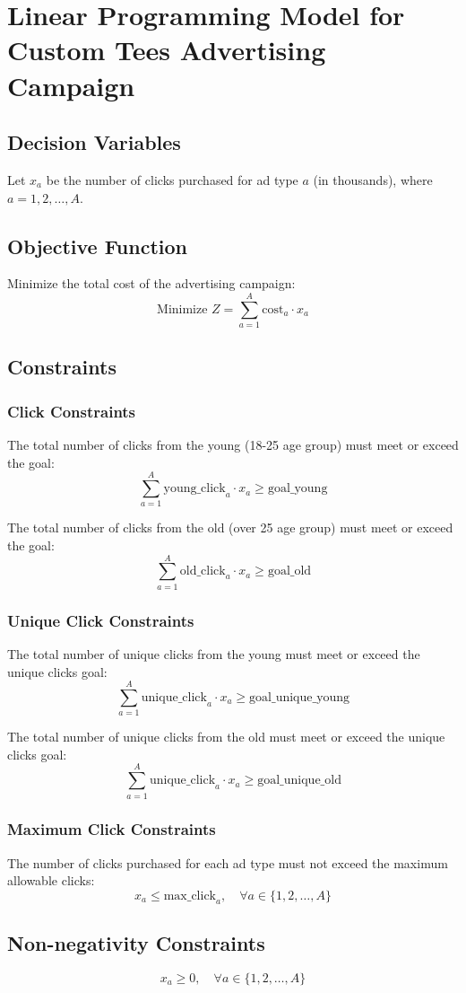 \documentclass{article}
\begin{document}
\section*{Linear Programming Model for Custom Tees Advertising Campaign}

\subsection*{Decision Variables}
Let \( x_a \) be the number of clicks purchased for ad type \( a \) (in thousands), where \( a = 1, 2, \ldots, A \).

\subsection*{Objective Function}
Minimize the total cost of the advertising campaign:
\[
\text{Minimize } Z = \sum_{a=1}^{A} \text{cost}_a \cdot x_a
\]

\subsection*{Constraints}

\subsubsection*{Click Constraints}
The total number of clicks from the young (18-25 age group) must meet or exceed the goal:
\[
\sum_{a=1}^{A} \text{young\_click}_{a} \cdot x_a \geq \text{goal\_young}
\]

The total number of clicks from the old (over 25 age group) must meet or exceed the goal:
\[
\sum_{a=1}^{A} \text{old\_click}_{a} \cdot x_a \geq \text{goal\_old}
\]

\subsubsection*{Unique Click Constraints}
The total number of unique clicks from the young must meet or exceed the unique clicks goal:
\[
\sum_{a=1}^{A} \text{unique\_click}_{a} \cdot x_a \geq \text{goal\_unique\_young}
\]

The total number of unique clicks from the old must meet or exceed the unique clicks goal:
\[
\sum_{a=1}^{A} \text{unique\_click}_{a} \cdot x_a \geq \text{goal\_unique\_old}
\]

\subsubsection*{Maximum Click Constraints}
The number of clicks purchased for each ad type must not exceed the maximum allowable clicks:
\[
x_a \leq \text{max\_click}_{a}, \quad \forall a \in \{1, 2, \ldots, A\}
\]

\subsection*{Non-negativity Constraints}
\[
x_a \geq 0, \quad \forall a \in \{1, 2, \ldots, A\}
\]
\end{document}
